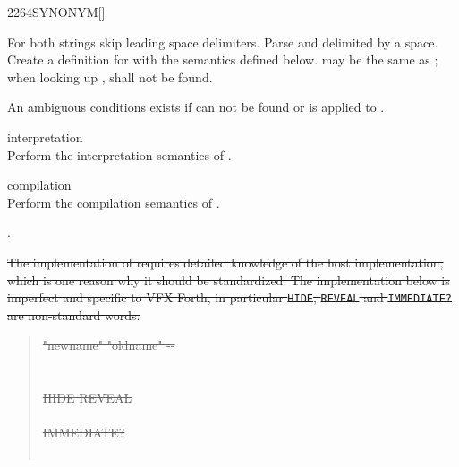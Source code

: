 \begin{worddef}{2264}{SYNONYM}[]%
\item {}

	For both strings skip leading space delimiters.  Parse 
	and  delimited by a space.  Create a definition for
	 with the semantics defined below.
	 may be the same as ;
	when looking up ,  shall not be found.

	An ambiguous conditions exists if  can not be found or
	 is applied to .

\item[\param{newname} interpretation]
	 \\
	Perform the interpretation semantics of .

\item[\param{newname} compilation]
	 \\
	Perform the compilation semantics of .

\see {}.

	\begin{implement} %
		\cbstart{}%
		\dffamily
		\sout{The implementation of  requires detailed knowledge
		of the host implementation, which is one reason why it should be
		standardized.  The implementation below is imperfect and specific
		to VFX Forth, in particular \texttt{HIDE}, \texttt{REVEAL} and
		\texttt{IMMEDIATE?} are non-standard words.}

		\begin{quote}\ttfamily
			\sout{\word{:}   "newname" "oldname" -{-}} \\
			\sout{ } \\
			\tab \sout{ } \\
			\tab[2] \sout{HIDE  \word{,} REVEAL} \\
			\tab \sout{} \\
			\tab[2] \sout{      IMMEDIATE? } \\
			\tab[2] \sout{    } \\
			\sout{\word{;}}
		\end{quote}
		\cbend
	\end{implement}
\end{worddef}


